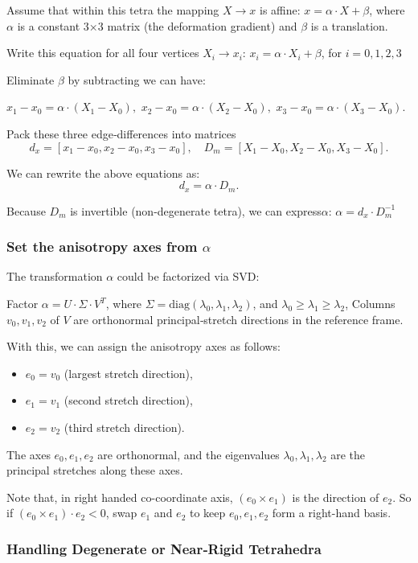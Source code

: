 \documentclass{article}
\begin{document}
Assume that within this tetra the mapping $X \to x$ is affine: $x = \alpha·X + \beta$, 
where $\alpha$ is a constant 3×3 matrix (the deformation gradient) and $\beta$ is a translation. 

Write this equation for all four vertices $X_i \to x_i$: $x_i = \alpha \cdot X_i + \beta$, for $i=0,1,2,3$

Eliminate $\beta$ by subtracting we can have:

$x_1 - x_0 = \alpha \cdot (X_1 - X_0), $
$x_2 - x_0 = \alpha \cdot (X_2 - X_0), $
$x_3 - x_0 = \alpha \cdot (X_3 - X_0). $

Pack these three edge‐differences into matrices
$$d_x = [ x_1-x_0 , x_2-x_0 , x_3-x_0 ], \quad 
D_m = [ X_1-X_0 , X_2-X_0 , X_3-X_0 ].$$

We can rewrite the above equations as:
$$d_x = \alpha \cdot D_m.$$

Because $D_m$ is invertible (non-degenerate tetra), we can express$\alpha$: $\alpha = d_x \cdot D_m^{-1}$

\subsubsection{Set the anisotropy axes from $\alpha$}
The transformation $\alpha$ could be factorized via SVD:

Factor $\alpha = U \cdot \Sigma \cdot V^T$, where 
$\Sigma = \text{diag}(\lambda_0,\lambda_1,\lambda_2)$, 
and $\lambda_0 \geq \lambda_1 \geq \lambda_2$, 
Columns $v_0,v_1,v_2$ of $V$ are orthonormal principal‐stretch directions in the reference frame.

With this, we can assign the anisotropy axes as follows:
\begin{itemize}
  \item $e_0 = v_0$ (largest stretch direction),
  \item $e_1 = v_1$ (second stretch direction),
  \item $e_2 = v_2$ (third stretch direction).
\end{itemize}
The axes $e_0,e_1,e_2$ are orthonormal, and the eigenvalues $\lambda_0,\lambda_1,\lambda_2$ are the principal stretches along these axes.

Note that, in right handed co-coordinate axis, $(e_0 \times e_1)$ is the direction of $e_2$. 
So if $(e_0 \times e_1) \cdot e_2 < 0$, swap $e_1$ and $e_2$ to keep $e_0,e_1,e_2$ form a right-hand basis.



\subsubsection{Handling Degenerate or Near‐Rigid Tetrahedra}
\end{document}
